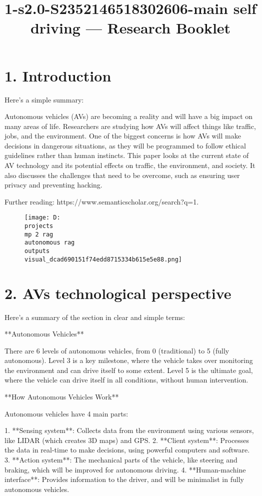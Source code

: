\documentclass[12pt,a4paper]{article}
\title{1-s2.0-S2352146518302606-main self driving — Research Booklet}
\date{}
\begin{document}
\maketitle
\tableofcontents
\newpage
\section{1. Introduction}
Here's a simple summary:

Autonomous vehicles (AVs) are becoming a reality and will have a big impact on many areas of life. Researchers are studying how AVs will affect things like traffic, jobs, and the environment. One of the biggest concerns is how AVs will make decisions in dangerous situations, as they will be programmed to follow ethical guidelines rather than human instincts. This paper looks at the current state of AV technology and its potential effects on traffic, the environment, and society. It also discusses the challenges that need to be overcome, such as ensuring user privacy and preventing hacking.

Further reading: https://www.semanticscholar.org/search?q=1.%
\begin{figure}[h]
\centering
\texttt{[image: D:\\projects\\mp 2 rag\\autonomous rag\\outputs\\visual\_dcad690151f74edd8715334b615e5e88.png]}
\end{figure}
\section{2. AVs technological perspective}
Here's a summary of the section in clear and simple terms:

**Autonomous Vehicles**

There are 6 levels of autonomous vehicles, from 0 (traditional) to 5 (fully autonomous). Level 3 is a key milestone, where the vehicle takes over monitoring the environment and can drive itself to some extent. Level 5 is the ultimate goal, where the vehicle can drive itself in all conditions, without human intervention.

**How Autonomous Vehicles Work**

Autonomous vehicles have 4 main parts:

1. **Sensing system**: Collects data from the environment using various sensors, like LIDAR (which creates 3D maps) and GPS.
2. **Client system**: Processes the data in real-time to make decisions, using powerful computers and software.
3. **Action system**: The mechanical parts of the vehicle, like steering and braking, which will be improved for autonomous driving.
4. **Human-machine interface**: Provides information to the driver, and will be minimalist in fully autonomous vehicles.
\end{document}
